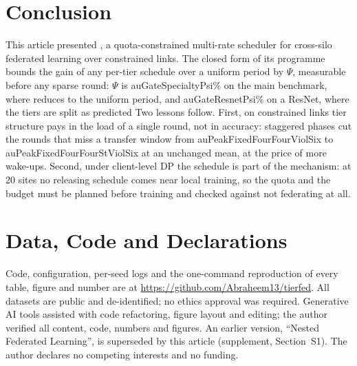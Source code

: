 \section{Conclusion}
\label{sec:conclusion}
This article presented \tierfed{}, a quota-constrained multi-rate scheduler for cross-silo federated learning over constrained links. The closed form of its programme bounds the gain of any per-tier schedule over a uniform period by $\Psi$, measurable before any sparse round: $\Psi$ is \num{auGateSpecialtyPsi}\% on the main benchmark, where \tierfed{} reduces to the uniform period, and \num{auGateResnetPsi}\% on a ResNet, where the tiers are split as predicted  Two lessons follow. First, on constrained links tier structure pays in the load of a single round, not in accuracy: staggered phases cut the rounds that miss a transfer window from \num{auPeakFixedFourFourViolSix} to \num{auPeakFixedFourFourStViolSix} at an unchanged mean, at the price of more wake-ups. Second, under client-level DP the schedule is part of the mechanism: at 20 sites no releasing schedule comes near local training, so the quota and the budget must be planned before training and checked against not federating at all.

\section*{Data, Code and Declarations}
Code, configuration, per-seed logs and the one-command reproduction of every table, figure and number are at \url{https://github.com/Abraheem13/tierfed}. All datasets are public and de-identified; no ethics approval was required. Generative AI tools assisted with code refactoring, figure layout and editing; the author verified all content, code, numbers and figures. An earlier version, ``Nested Federated Learning'', is superseded by this article (supplement, Section~S1). The author declares no competing interests and no funding.
